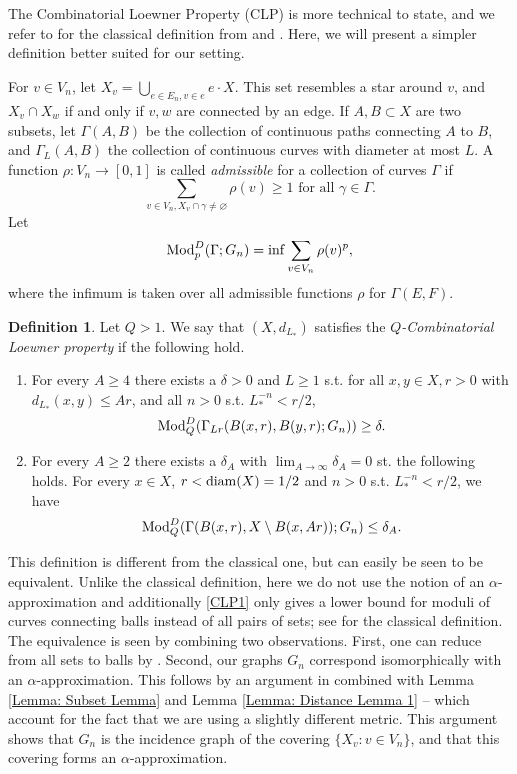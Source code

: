 \documentclass{amsart}
\newcommand{\diam}{{\rm diam}}
\newcommand{\Mod}{{\rm Mod}}
\numberwithin{equation}{section}
\theoremstyle{definition}
\newtheorem{definition}[equation]{Definition}
\theoremstyle{remark}
\begin{document}
The Combinatorial Loewner Property (CLP) is more technical to state, and we refer to \cite{anttila2024constructions} for the classical definition from \cite{BourK} and \cite{clais}. Here, we will present a simpler definition better suited for our setting.

For $v\in V_n$, let $X_v = \bigcup_{e\in E_n, v\in e} e \cdot X$. This set resembles a star around $v$, and $X_v\cap X_w$ if and only if $v,w$ are connected by an edge. If $A,B\subset X$ are two subsets, let $\Gamma(A,B)$ be the collection of continuous paths connecting $A$ to $B$, and $\Gamma_L(A,B)$ the collection of continuous curves with diameter at most $L$. A function $\rho:V_n\to [0,1]$ is called \emph{admissible} for a collection of curves $\Gamma$ if 
\[
\sum_{v\in V_n, X_v\cap \gamma \neq \varnothing} \rho(v)\geq 1
\text{ for all } 
\gamma \in \Gamma.
\]
Let
\[
\Mod_p^D(\Gamma;G_n)=\inf \sum_{v\in V_n} \rho(v)^p,
\]
where the infimum is taken over all admissible functions $\rho$ for $\Gamma(E,F)$. 


\begin{definition} Let $Q>1$. We say that $(X,d_{L_*})$ satisfies the \emph{$Q$-Combinatorial Loewner property} if the following hold.
\begin{enumerate}[label={\color{blue}{\textup{$($CLP\arabic*}$)$}}, widest=a, leftmargin=*]
\item\label{CLP1} For every $A\geq 4$ there exists a $\delta>0$ and $L\geq 1$ s.t. for all $x,y\in X, r>0$ with $d_{L_*}(x,y)\leq Ar$, and all $n>0$ s.t. $L_*^{-n}<r/2$,
\[
\Mod_Q^D(\Gamma_{Lr}(B(x,r),B(y,r); G_n))\geq \delta.
\]
\item\label{CLP2} For every $A\geq 2$ there exists a $\delta_A$ with $\lim_{A\to \infty} \delta_A = 0$ st. the following holds. For every $x\in X$, $r<\diam(X)=1/2$ and $n>0$ s.t. $L_*^{-n}<r/2$, we have
\[
\Mod_Q^D(\Gamma(B(x,r),X \setminus B(x,Ar)); G_n)\leq \delta_A.
\]
\end{enumerate}
\end{definition}
This definition is different from the classical one, but can easily be seen to be equivalent. Unlike the classical definition, here we do not use the notion of an $\alpha$-approximation and additionally \ref{CLP1} only gives a lower bound for moduli of curves connecting balls instead of all pairs of sets; see \cite{anttila2024constructions} for the classical definition. The equivalence is seen by combining two observations. First, one can reduce from all sets to balls by \cite[Proposition 2.9]{BourK}. Second, our graphs $G_n$ correspond isomorphically with an $\alpha$-approximation. This follows by an argument in \cite[Proposition 3.37]{anttila2024constructions} combined with Lemma \ref{Lemma: Subset Lemma} and Lemma \ref{Lemma: Distance Lemma 1} -- which account for the fact that we are using a slightly different metric. This argument shows that $G_n$ is the incidence graph of the covering $\{X_v : v\in V_n\}$, and that this covering forms an $\alpha$-approximation.
\end{document}
